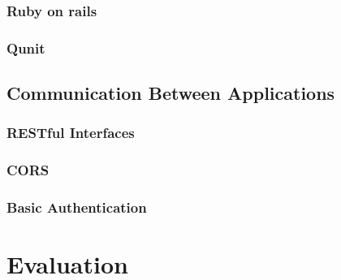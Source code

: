 \documentclass{article}
\begin{document}
\subsubsection{Ruby on rails}

\subsubsection{Qunit}

\subsection{Communication Between Applications}

\subsubsection{RESTful Interfaces}

\subsubsection{CORS}

\subsubsection{Basic Authentication}

\newpage
\section{Evaluation}

\newpage
\end{document}
